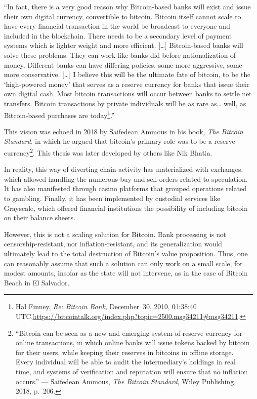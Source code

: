 \documentclass[
  a5paper,
  smalldemyvopaper,10pt,twoside,onecolumn,openright,extrafontsizes,hidelinks]{memoir}
\begin{document}
``In fact, there is a very good reason why Bitcoin-based banks will
exist and issue their own digital currency, convertible to bitcoin.
Bitcoin itself cannot scale to have every financial transaction in the
world be broadcast to everyone and included in the blockchain. There
needs to be a secondary level of payment systems which is lighter weight
and more efficient. {[}\ldots{]} Bitcoin-based banks will solve these
problems. They can work like banks did before nationalization of money.
Different banks can have differing policies, some more aggressive, some
more conservative. {[}\ldots{]} I believe this will be the ultimate fate
of bitcoin, to be the `high-powered money' that serves as a reserve
currency for banks that issue their own digital cash. Most bitcoin
transactions will occur between banks to settle net transfers. Bitcoin
transactions by private individuals will be as rare as\ldots{} well, as
Bitcoin-based purchases are today\footnote{Hal Finney, \emph{Re: Bitcoin
  Bank}, December~30, 2010, 01:38:40
  UTC,\url{https://bitcointalk.org/index.php?topic=2500.msg34211\#msg34211}.}.''

This vision was echoed in 2018 by Saifedean Ammous in his book,
\emph{The Bitcoin Standard}, in which he argued that bitcoin's primary
role was to be a reserve currency\footnote{``Bitcoin can be seen as a
  new and emerging system of reserve currency for online transactions,
  in which online banks will issue tokens backed by bitcoin for their
  users, while keeping their reserves in bitcoins in offline storage.
  Every individual will be able to audit the intermediary's holdings in
  real time, and systems of verification and reputation will ensure that
  no inflation occurs.'' --- Saifedean Ammous, \emph{The Bitcoin
  Standard}, Wiley Publishing, 2018, p.~206.}. This thesis was later
developed by others like Nik Bhatia.

In reality, this way of diverting chain activity has materialized with
exchanges, which allowed handling the numerous buy and sell orders
related to speculation. It has also manifested through casino platforms
that grouped operations related to gambling. Finally, it has been
implemented by custodial services like Grayscale, which offered
financial institutions the possibility of including bitcoin on their
balance sheets.

However, this is not a scaling solution for Bitcoin. Bank processing is
not censorship-resistant, nor inflation-resistant, and its
generalization would ultimately lead to the total destruction of
Bitcoin's value proposition. Thus, one can reasonably assume that such a
solution can only work on a small scale, for modest amounts, insofar as
the state will not intervene, as in the case of Bitcoin Beach in El
Salvador.
\end{document}
